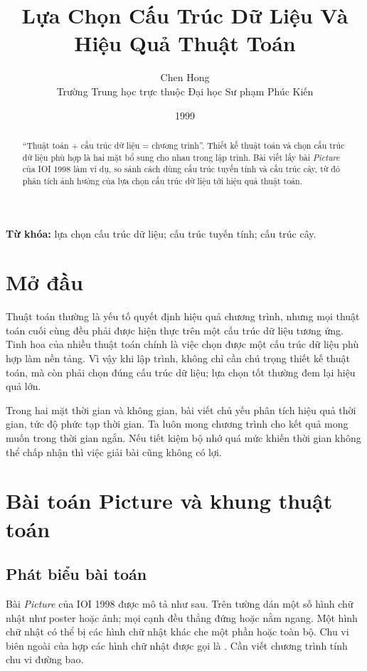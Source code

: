 \documentclass[11pt]{article}
\title{Lựa Chọn Cấu Trúc Dữ Liệu Và Hiệu Quả Thuật Toán}
\author{Chen Hong\\Trường Trung học trực thuộc Đại học Sư phạm Phúc Kiến}
\date{1999}
\begin{document}
\maketitle


\begin{abstract}
``Thuật toán + cấu trúc dữ liệu = chương trình''. Thiết kế thuật toán và chọn
cấu trúc dữ liệu phù hợp là hai mặt bổ sung cho nhau trong lập trình. Bài viết
lấy bài \textit{Picture} của IOI 1998 làm ví dụ, so sánh cách dùng cấu trúc
tuyến tính và cấu trúc cây, từ đó phân tích ảnh hưởng của lựa chọn cấu trúc dữ
liệu tới hiệu quả thuật toán.
\end{abstract}

\noindent\textbf{Từ khóa:} lựa chọn cấu trúc dữ liệu; cấu trúc tuyến tính; cấu
trúc cây.

\section{Mở đầu}

Thuật toán thường là yếu tố quyết định hiệu quả chương trình, nhưng mọi thuật
toán cuối cùng đều phải được hiện thực trên một cấu trúc dữ liệu tương ứng.
Tinh hoa của nhiều thuật toán chính là việc chọn được một cấu trúc dữ liệu phù
hợp làm nền tảng. Vì vậy khi lập trình, không chỉ cần chú trọng thiết kế thuật
toán, mà còn phải chọn đúng cấu trúc dữ liệu; lựa chọn tốt thường đem lại hiệu
quả lớn.

Trong hai mặt thời gian và không gian, bài viết chủ yếu phân tích hiệu quả
thời gian, tức độ phức tạp thời gian. Ta luôn mong chương trình cho kết quả
mong muốn trong thời gian ngắn. Nếu tiết kiệm bộ nhớ quá mức khiến thời gian
không thể chấp nhận thì việc giải bài cũng không có lợi.

\section{Bài toán Picture và khung thuật toán}

\subsection{Phát biểu bài toán}

Bài \textit{Picture} của IOI 1998 được mô tả như sau. Trên tường dán một số
hình chữ nhật như poster hoặc ảnh; mọi cạnh đều thẳng đứng hoặc nằm ngang. Một
hình chữ nhật có thể bị các hình chữ nhật khác che một phần hoặc toàn bộ. Chu
vi biên ngoài của hợp các hình chữ nhật được gọi là .
Cần viết chương trình tính chu vi đường bao.
\end{document}
